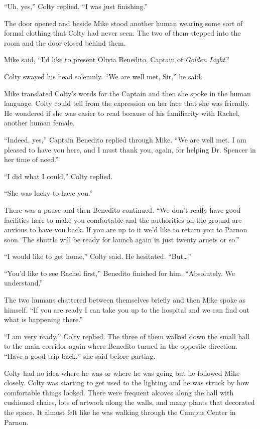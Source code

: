 ``Uh, yes,'' Colty replied. ``I was just finishing.''

The door opened and beside Mike stood another human wearing some sort of formal clothing that
Colty had never seen. The two of them stepped into the room and the door closed behind them.

Mike said, ``I'd like to present Olivia Benedito, Captain of \textit{Golden Light}.''

Colty swayed his head solemnly. ``We are well met, Sir,'' he said.

Mike translated Colty's words for the Captain and then she spoke in the human language. Colty
could tell from the expression on her face that she was friendly. He wondered if she was easier
to read because of his familiarity with Rachel, another human female.

``Indeed, yes,'' Captain Benedito replied through Mike. ``We are well met. I am pleased to have
you here, and I must thank you, again, for helping Dr. Spencer in her time of need.''

``I did what I could,'' Colty replied.

``She was lucky to have you.''

There was a pause and then Benedito continued. ``We don't really have good facilities here to
make you comfortable and the authorities on the ground are anxious to have you back. If you are
up to it we'd like to return you to Parnon soon. The shuttle will be ready for launch again in
just twenty arnets or so.''

``I would like to get home,'' Colty said. He hesitated. ``But\ldots''

``You'd like to see Rachel first,'' Benedito finished for him. ``Absolutely. We understand.''

The two humans chattered between themselves briefly and then Mike spoke as himself. ``If you are
ready I can take you up to the hospital and we can find out what is happening there.''

``I am very ready,'' Colty replied. The three of them walked down the small hall to the main
corridor again where Benedito turned in the opposite direction. ``Have a good trip back,'' she
said before parting.

Colty had no idea where he was or where he was going but he followed Mike closely. Colty was
starting to get used to the lighting and he was struck by how comfortable things looked. There
were frequent alcoves along the hall with cushioned chairs, lots of artwork along the walls, and
many plants that decorated the space. It almost felt like he was walking through the Campus
Center in Parnon.

